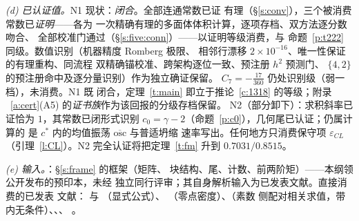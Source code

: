 \documentclass[11pt]{article}
\numberwithin{equation}{section}
\theoremstyle{definition}
\theoremstyle{remark}
\begin{document}
\emph{(d) 已认证值。}N1 现状：\emph{闭合}。全部连通常数已证
有理（\S\ref{s:conv}），三个被消费常数已\emph{证明}——各为
一次精确有理的多面体体积计算，逐项存档、双方法逐分数吻合、
全部校准门通过（\S\ref{s:five:conn}）——以证明等级消费，与
命题~\ref{p:t222} 同级。数值识别（机器精度 Romberg 极限、
相邻行漂移 $2\times10^{-16}$、唯一性保证的有理重构、同流程
双精确锚校准、跨架构逐位一致、预注册 $h^{2}$ 预测门、
$\{4,2\}$ 的预注册命中及逐分量识别）作为独立确证保留。
$C_7=-\tfrac{17}{360}$ 仍处识别级（弱一档），未消费。N1 既
闭合，定理~\ref{t:main} 即立于推论~\ref{c:1318} 的等级；附录
~\ref{a:cert}(A5) 的\emph{证书族}作为该回报的分级存档保留。
N2（部分卸下）：求积斜率已证恰为 $1$，其常数已闭形式识别
$c_0=\gamma-2$（命题~\ref{p:c0}），几何尾已认证；仍属计算的
是 $c^{*}$ 内的均值振荡 $\overline{\mathrm{osc}}$ 与普适坍缩
速率写出。任何地方只消费保守项 $\varepsilon_{CL}$
（引理~\ref{l:CL}）。N2 完全认证将把定理~\ref{t:fm} 升到
$0.7031/0.8515$。

\emph{(e) 输入。}\cite{C26}：\S\ref{s:frame} 的框架（矩阵、
块结构、尾、计数、前两阶矩）——本纲领公开发布的预印本，未经
独立同行评审；其自身解析输入为已发表文献。直接消费的已发表
文献：\cite{Wei52} 与 \cite[定理~5.12]{IK}（显式公式）、
\cite[定理~9.2]{Tit86}（零点密度）、\cite{Mon73,BGST}（素数
侧配对相关求值，带内无条件）、\cite{MRT}、\cite{HR}、
\cite{Dav}。
\end{document}
